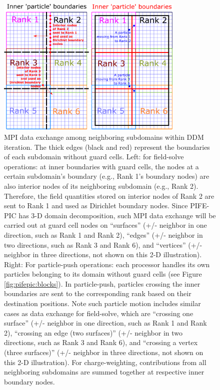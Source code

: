 \documentclass{siamart171218}
\begin{document}
\begin{figure}[ht!]
\centering
\includegraphics[width=0.80\textwidth]{innerBC_marked.png}
\caption{MPI data exchange among neighboring subdomains within DDM iteration.
The thick edges (black and red) represent the boundaries of each subdomain without guard cells.
Left: for field-solve operations: at inner boundaries with guard cells,
the nodes at a certain subdomain's boundary (e.g., Rank 1's boundary nodes)
are also interior nodes of its neighboring subdomain (e.g., Rank 2).
Therefore, the field quantities stored on interior nodes of Rank 2
are sent to Rank 1 and used as Dirichlet boundary nodes.
Since PIFE-PIC has 3-D domain decomposition,
such MPI data exchange will be carried out
at guard cell nodes on ``surfaces''
(+/- neighbor in one direction, such as Rank 1 and Rank 2),
``edges'' (+/- neighbor in two directions, such as Rank 3 and Rank 6),
and ``vertices'' (+/- neighbor in three directions, not shown on this 2-D illustration).
Right: For particle-push operations:
each processor handles its own particles belonging to its domain
without guard cells (see Figure \ref{fig:pifepic:blocks}).
In particle-push, particles crossing the inner boundaries
are sent to the corresponding rank based on their destination positions.
Note such particle motion includes similar cases as data exchange for field-solve,
which are ``crossing one surface''
(+/- neighbor in one direction, such as Rank 1 and Rank 2),
``crossing an edge (two surfaces)''
(+/- neighbor in two directions, such as Rank 3 and Rank 6),
and ``crossing a vertex (three surfaces)''
(+/- neighbor in three directions, not shown on this 2-D illustration).
For charge-weighting, contributions from all neighboring subdomains are summed together
at respective inner boundary nodes.}
\label{fig:innerBC}
\end{figure}
\end{document}
